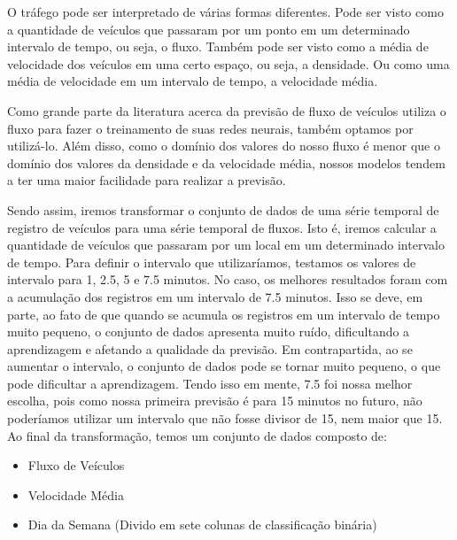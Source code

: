 O tráfego pode ser interpretado de várias formas diferentes. Pode ser visto como a quantidade de veículos que passaram por um ponto em um determinado intervalo de tempo, ou seja, o fluxo. Também pode ser visto como a média de velocidade dos veículos em uma certo espaço, ou seja, a densidade. Ou como uma média de velocidade em um intervalo de tempo, a velocidade média.

Como grande parte da literatura acerca da previsão de fluxo de veículos utiliza o fluxo para fazer o treinamento de suas redes neurais, também optamos por utilizá-lo. Além disso, como o domínio dos valores do nosso fluxo é menor que o domínio dos valores da densidade e da velocidade média, nossos modelos tendem a ter uma maior facilidade para realizar a previsão.

Sendo assim, iremos transformar o conjunto de dados de uma série temporal de registro de veículos para uma série temporal de fluxos. Isto é, iremos calcular a quantidade de veículos que passaram por um local em um determinado intervalo de tempo. Para definir o intervalo que utilizaríamos, testamos os valores de intervalo para 1, 2.5, 5 e 7.5 minutos. No caso, os melhores resultados foram com a acumulação dos registros em um intervalo de 7.5 minutos. Isso se deve, em parte, ao fato de que quando se acumula os registros em um intervalo de tempo muito pequeno, o conjunto de dados apresenta muito ruído, dificultando a aprendizagem e afetando a qualidade da previsão. Em contrapartida, ao se aumentar o intervalo, o conjunto de dados pode se tornar muito pequeno, o que pode dificultar a aprendizagem. Tendo isso em mente, 7.5 foi nossa melhor escolha, pois como nossa primeira previsão é para 15 minutos no futuro, não poderíamos utilizar um intervalo que não fosse divisor de 15, nem maior que 15. Ao final da transformação, temos um conjunto de dados composto de:

\begin{itemize}
    \item Fluxo de Veículos
    \item Velocidade Média
    \item Dia da Semana (Divido em sete colunas de classificação binária)
\end{itemize}

